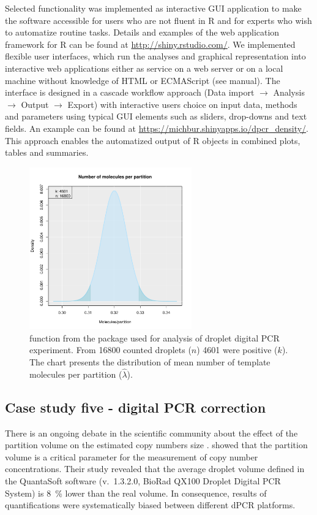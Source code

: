 Selected functionality was implemented as interactive  GUI 
application to make the software accessible for users who are not fluent in R 
and for experts who wish to automatize routine tasks. Details and examples of 
the  web application framework for R can be found at 
\url{http://shiny.rstudio.com/}. We implemented flexible user interfaces, which 
run the analyses and graphical representation into interactive web applications 
either as service on a web server or on a local machine without knowledge of 
HTML or ECMAScript (see  manual). The interface is designed in a 
cascade workflow approach (Data import $\rightarrow$ Analysis $\rightarrow$ 
Output $\rightarrow$ Export) with interactive users choice on input data, 
methods and parameters using typical GUI elements such as sliders, drop-downs 
and text fields. An example can be found at 
\url{https://michbur.shinyapps.io/dpcr_density/}. This approach enables the 
automatized output of R objects in combined plots, tables and summaries.

\begin{figure}[htbp]
  \centering
  \includegraphics[clip=true, width=7cm]{figures/dpcR.pdf}
  \caption{ function from the  package used 
for analysis of droplet digital PCR experiment. From 16800 counted droplets 
($n$) 4601 were positive ($k$). The chart presents the distribution of mean 
number of 
template molecules per partition ($\hat \lambda$). 
}
  \label{figure:dpcR}
\end{figure}

\subsection{Case study five - digital PCR correction}

There is an ongoing debate in the scientific community about the effect of the 
partition volume on the estimated copy numbers size 
\citep{huggett_clinchem_2014, corbisier_2015, majumdar_2015}. 
\citet{corbisier_2015} showed that the partition volume is a critical parameter 
for the measurement of copy number concentrations. Their study revealed that the 
average droplet volume defined in the QuantaSoft software (v.~1.3.2.0, BioRad 
QX100 Droplet Digital PCR System) is 8~\% lower than the real volume. In 
consequence, results of quantifications were systematically biased between 
different dPCR platforms. 


